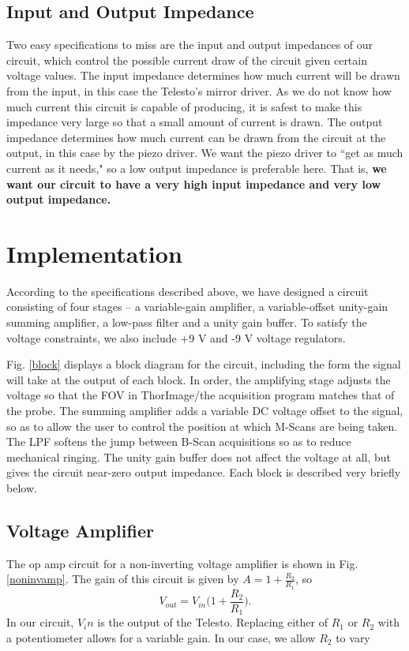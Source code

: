 \documentclass{article}
\begin{document}
\subsection{Input and Output Impedance}
\par{Two easy specifications to miss are the input and output impedances of our circuit, which control the possible current draw of the circuit given certain voltage values. The input impedance determines how much current will be drawn from the input, in this case the Telesto's mirror driver. As we do not know how much current this circuit is capable of producing, it is safest to make this impedance very large so that a small amount of current is drawn. The output impedance determines how much current can be drawn from the circuit at the output, in this case by the piezo driver. We want the piezo driver to ``get as much current as it needs," so a low output impedance is preferable here. That is, \textbf{we want our circuit to have a very high input impedance and very low output impedance.}}
\section{Implementation}
\par{According to the specifications described above, we have designed a circuit consisting of four stages -- a variable-gain amplifier, a variable-offset unity-gain summing amplifier, a low-pass filter and a unity gain buffer. To satisfy the voltage constraints, we also include +9 V and -9 V voltage regulators.}
\par{Fig. \ref{block} displays a block diagram for the circuit, including the form the signal will take at the output of each block. In order, the amplifying stage adjusts the voltage so that the FOV in ThorImage/the acquisition program matches that of the probe. The summing amplifier adds a variable DC voltage offset to the signal, so as to allow the user to control the position at which M-Scans are being taken. The LPF softens the jump between B-Scan acquisitions so as to reduce mechanical ringing. The unity gain buffer does not affect the voltage at all, but gives the circuit near-zero output impedance. Each block is described very briefly below.}


\subsection{Voltage Amplifier}

\par{The op amp circuit for a non-inverting voltage amplifier is shown in Fig. \ref{noninvamp}. The gain of this circuit is given by $A=1+\frac{R_2}{R_1}$, so 
	\begin{equation}
		V_{out} = V_{in}\Big(1+\frac{R_2}{R_1}\Big).
	\end{equation}
In our circuit, $V_in$ is the output of the Telesto. Replacing either of $R_1$ or $R_2$ with a potentiometer allows for a variable gain. In our case, we allow $R_2$ to vary}
\end{document}
